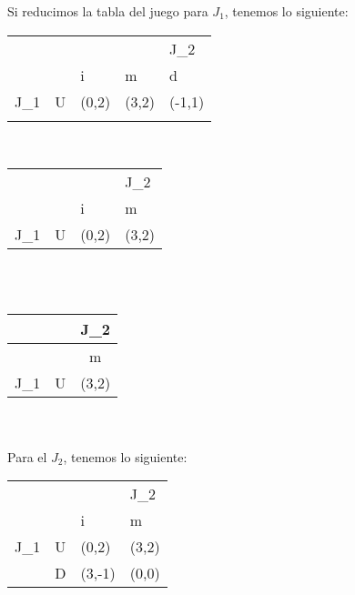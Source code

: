 \documentclass{homework}
\begin{document}
Si reducimos la tabla del juego para $J_1$, tenemos lo siguiente:

\begin{tabular}{lllll} 
 &  &  &  & J_2 \\ \cline{3-5} 
& \multicolumn{1}{l|}{} & \multicolumn{1}{l|}{i} & \multicolumn{1}{l|}{m} & \multicolumn{1}{l|}{d} \\ \cline{2-5} 
\multicolumn{1}{l|}{J_1} & \multicolumn{1}{l|}{U} & \multicolumn{1}{l|}{(0,2)} & \multicolumn{1}{l|}{(3,2)} & \multicolumn{1}{l|}{(-1,1)} \\ \cline{2-5} \\
\end{tabular}\\

\begin{tabular}{llll}
 &  &  & J_2 \\ \cline{3-4} 
 & \multicolumn{1}{l|}{} & \multicolumn{1}{l|}{i} & \multicolumn{1}{l|}{m} \\ \cline{2-4} 
\multicolumn{1}{l|}{J_1} & \multicolumn{1}{l|}{U} & \multicolumn{1}{l|}{(0,2)} & \multicolumn{1}{l|}{(3,2)} \\ \cline{2-4}  
\end{tabular}\\\\

\begin{tabular}{| c | c |c |}
\hline
& &J_2 \\ \hline
 &  & m \\\hline
J_1 & U & (3,2) \\\hline
\end{tabular}\\\\

Para el $J_2$, tenemos lo siguiente:\\
\begin{tabular}{llll}
 &  &  & J_2 \\ \cline{3-4} 
 & \multicolumn{1}{l|}{} & \multicolumn{1}{l|}{i} & \multicolumn{1}{l|}{m} \\ \cline{2-4} 
\multicolumn{1}{l|}{J_1} & \multicolumn{1}{l|}{U} & \multicolumn{1}{l|}{(0,2)} & \multicolumn{1}{l|}{(3,2)} \\ \cline{2-4} 
\multicolumn{1}{l|}{} & \multicolumn{1}{l|}{D} & \multicolumn{1}{l|}{(3,-1)} & \multicolumn{1}{l|}{(0,0)} \\ \cline{2-4} 
\end{tabular}\\\\
\end{document}
